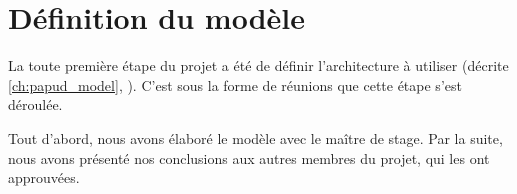 \section{Définition du modèle}

La toute première étape du projet a été de définir l'architecture à utiliser (décrite \autoref{ch:papud_model}, ). C'est sous la forme de réunions que cette étape s'est déroulée.

Tout d'abord, nous avons élaboré le modèle avec le maître de stage.
Par la suite, nous avons présenté nos conclusions aux autres membres du projet, qui les ont approuvées.
